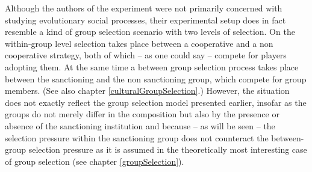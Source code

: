 Although the authors of the experiment were not primarily concerned with
studying evolutionary social processes, their experimental setup does in fact
resemble a kind of group selection scenario with two levels of selection. On
the within-group level selection takes place between a cooperative and a non
cooperative strategy, both of which -- as one could say -- compete for players
adopting them. At the same time a between group selection process takes place
between the sanctioning and the non sanctioning group, which compete for group
members. (See also chapter \ref{culturalGroupSelection}.) However, the
situation does not exactly reflect the group selection model presented
earlier, insofar as the groups do not merely differ in the composition but
also by the presence or absence of the sanctioning institution and because --
as will be seen -- the selection pressure within the sanctioning group does
not counteract the between-group selection pressure as it is assumed in the
theoretically most interesting case of group selection (see chapter
\ref{groupSelection}).

